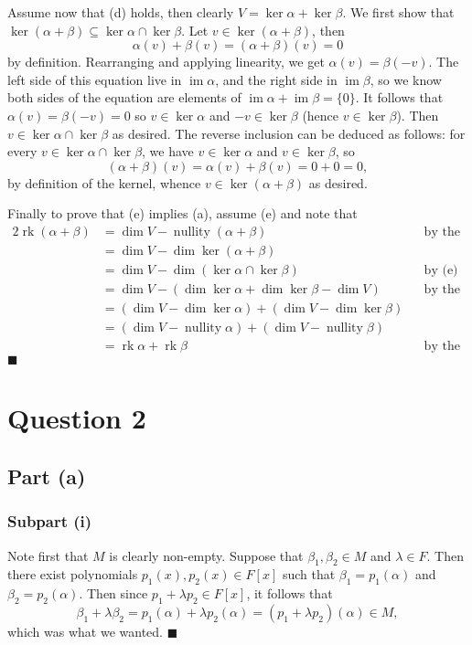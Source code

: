 \documentclass[12pt]{article}
\DeclareMathOperator{\im}{im}
\DeclareMathOperator{\rk}{rk}
\DeclareMathOperator{\nullity}{nullity}
\begin{document}
Assume now that (d) holds, then clearly $V=\ker\alpha+\ker\beta$. We first show
that $\ker(\alpha+\beta)\subseteq\ker\alpha\cap\ker\beta$. Let
$v\in\ker(\alpha+\beta)$, then
\[
    \alpha(v)+\beta(v)=(\alpha+\beta)(v)=0
\]
by definition. Rearranging and applying linearity, we get $\alpha(v)=\beta(-v)$.
The left side of this equation live in $\im\alpha$, and the right side in
$\im\beta$, so we know both sides of the equation are elements of
$\im\alpha+\im\beta=\{0\}$. It follows that $\alpha(v)=\beta(-v)=0$ so
$v\in\ker\alpha$ and $-v\in\ker\beta$ (hence $v\in\ker\beta$). Then
$v\in\ker\alpha\cap\ker\beta$ as desired. The reverse inclusion can be deduced
as follows: for every $v\in\ker\alpha\cap\ker\beta$, we have $v\in\ker\alpha$
and $v\in\ker\beta$, so
\[
    (\alpha+\beta)(v)=\alpha(v)+\beta(v)=0+0=0,
\]
by definition of the kernel, whence $v\in\ker(\alpha+\beta)$ as desired.

Finally to prove that (e) implies (a), assume (e) and note that
\begin{alignat*}{2}
    \rk(\alpha+\beta)
    &=\dim V - \nullity (\alpha+\beta) && \text{by the rank-nullity theorem}
  \\&=\dim V - \dim\ker(\alpha+\beta)
  \\&=\dim V - \dim(\ker\alpha\cap\ker\beta) &&\text{by (e)}
  \\&=\dim V - (\dim\ker\alpha + \dim\ker\beta -\dim V)
    &&\text{by the dimension formula}
  \\&=(\dim V - \dim\ker\alpha) + (\dim V - \dim\ker\beta)
  \\&=(\dim V - \nullity\alpha) + (\dim V - \nullity\beta)
  \\&=\rk\alpha + \rk\beta && \text{by the rank-nullity theorem.}
\end{alignat*}
\hfill$\blacksquare$

\newpage
\section*{Question 2}
\subsection*{Part (a)}
\subsubsection*{Subpart (i)}
Note first that $M$ is clearly non-empty. Suppose that $\beta_1,\beta_2\in M$
and $\lambda\in F$. Then there exist polynomials $p_1(x), p_2(x)\in F[x]$
such that $\beta_1=p_1(\alpha)$ and $\beta_2=p_2(\alpha)$. Then since
$p_1+\lambda p_2\in F[x]$, it follows that
\[
    \beta_1+\lambda\beta_2 = p_1(\alpha)+\lambda p_2(\alpha)
    = (p_1+\lambda p_2)(\alpha)\in M,
\]
which was what we wanted.
\hfill$\blacksquare$
\end{document}
